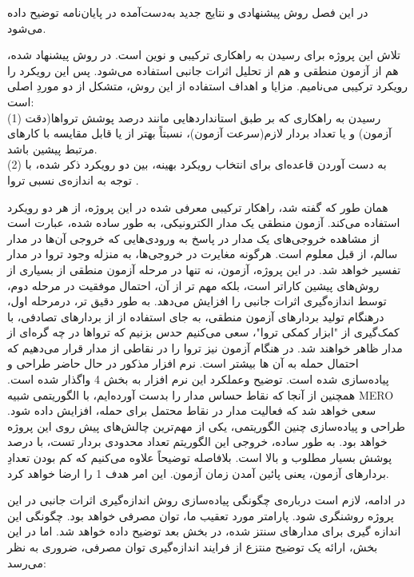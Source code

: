 

در این فصل روش پیشنهادی و  نتایج جدید به‌دست‌آمده در پایان‌نامه توضیح داده می‌شود.


تلاش این پروژه برای رسیدن به راهکاری ترکیبی و نوین است. در روش پیشنهاد شده، هم از آزمون منطقی و هم از تحلیل اثرات جانبی استفاده می‌شود. پس این رویکرد را رویکرد ترکیبی می‌نامیم. مزایا و اهداف استفاده از این روش، متشکل از دو موردِ اصلی است: \\
(1) رسیدن به راهکاری که بر طبق استانداردهایی مانند درصد پوشش تروا‌ها(دقت آزمون) و یا تعداد بردار لازم(سرعت آزمون)، نسبتاً بهتر از یا قابل مقایسه با کارهای مرتبط پیشین باشد. \\
(2)  به دست آوردن قاعده‌ای برای انتخاب رویکرد بهینه، بین دو رویکرد ذکر شده، با توجه به اندازه‌ی نسبی تروا . 

همان طور که گفته شد، راهکار ترکیبی معرفی شده در این پروژه، از هر دو رویکرد استفاده می‌کند. آزمون منطقی یک مدار الکترونیکی، به طور ساده شده، عبارت است از مشاهده خروجی‌های یک مدار در پاسخ به ورودی‌هایی که خروجی آن‌ها در مدار سالم، از قبل معلوم است. هرگونه مغایرت در خروجی‌ها، به منزله وجود تروا در مدار تفسیر خواهد شد. در این پروژه، آزمون، نه تنها در مرحله آزمون منطقی از بسیاری از روش‌های پیشین کاراتر است، بلکه مهم تر از آن، احتمال موفقیت در مرحله دوم، توسط اندازه‌گیری اثرات جانبی را افزایش می‌دهد. به طور دقیق تر، درمرحله اول، درهنگام تولید بردارهای آزمون منطقی، به جای استفاده از از بردارهای تصادفی، با کمک‌گیری از "ابزار کمکی تروا"، سعی می‌کنیم حدس بزنیم که تروا‌ها در چه گره‌ای از مدار ظاهر خواهند شد. در هنگام آزمون نیز تروا را در نقاطی از مدار قرار می‌دهیم که احتمال حمله به آن ها بیشتر است. نرم افزار مذکور در حال حاضر طراحی و پیاده‌سازی شده است. توضیح وعملکرد این نرم افزار به بخش 4 واگذار شده است. همچنین از آنجا که نقاط حساس مدار را بدست آورده‌ایم، با الگوریتمی شبیه MERO سعی خواهد شد که فعالیت مدار در نقاط محتمل برای حمله، افزایش داده شود. طراحی و پیاده‌سازی چنین الگوریتمی، یکی از مهم‌ترین چالش‌های پیش روی این پروژه خواهد بود. به طور ساده، خروجی این الگوریتم تعداد محدودی بردار تست، با درصد پوشش بسیار مطلوب و بالا است. بلافاصله توضیحاً علاوه می‌کنیم که کم بودن تعدادِ بردارهای آزمون، یعنی پائین آمدن زمان آزمون. این امر هدف 1 را ارضا خواهد کرد.

در ادامه، لازم است درباره‌ی چگونگی پیاده‌سازی روش اندازه‌گیری اثرات جانبی در این پروژه روشنگری شود. پارامتر مورد تعقیب ما، توان مصرفی خواهد بود. چگونگی این اندازه گیری برای مدارهای سنتز شده، در بخش بعد توضیح داده خواهد شد. اما در این بخش، ارائه یک توضیح منتزع از فرایند اندازه‌گیری توان مصرفی، ضروری به نظر می‌رسد:
 
